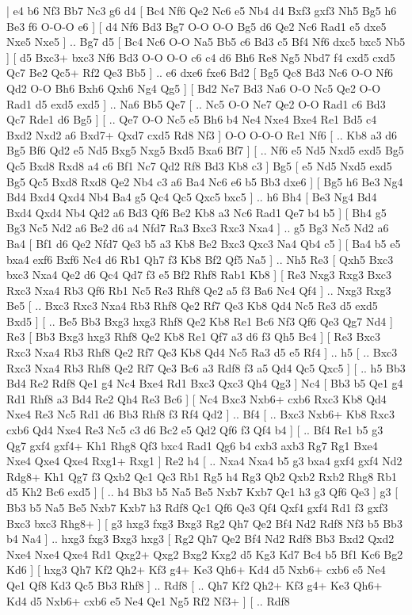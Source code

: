 \makegametitle 
|   e4   b6    Nf3   Bb7    Nc3   g6    d4 [  Bc4 Nf6  Qe2 Nc6  e5 Nb4  d4 Bxf3  gxf3 Nh5  Bg5 h6  Be3 f6  O-O-O e6   ]  [  d4 Nf6  Bd3 Bg7  O-O O-O  Bg5 d6  Qe2 Nc6  Rad1 e5  dxe5 Nxe5  Nxe5   ] .. Bg7    d5 [  Bc4 Nc6  O-O Na5  Bb5 c6  Bd3 c5  Bf4 Nf6  dxc5 bxc5  Nb5   ]  [  d5 Bxc3+  bxc3 Nf6  Bd3 O-O  O-O c6  c4 d6  Bh6 Re8  Ng5 Nbd7  f4 cxd5  cxd5 Qc7  Be2 Qc5+  Rf2 Qe3  Bb5   ] .. e6    dxe6   fxe6    Bd2 [  Bg5 Qc8  Bd3 Nc6  O-O Nf6  Qd2 O-O  Bh6 Bxh6  Qxh6 Ng4  Qg5   ]  [  Bd2 Ne7  Bd3 Na6  O-O Nc5  Qe2 O-O  Rad1 d5  exd5 exd5   ] .. Na6    Bb5   Qe7 [ .. Nc5  O-O Ne7  Qe2 O-O  Rad1 c6  Bd3 Qc7  Rde1 d6  Bg5   ]  [ .. Qe7  O-O Nc5  e5 Bh6  b4 Ne4  Nxe4 Bxe4  Re1 Bd5  c4 Bxd2  Nxd2 a6  Bxd7+ Qxd7  cxd5 Rd8  Nf3   ]  O-O   O-O-O    Re1   Nf6 [ .. Kb8  a3 d6  Bg5 Bf6  Qd2 e5  Nd5 Bxg5  Nxg5 Bxd5  Bxa6 Bf7   ]  [ .. Nf6  e5 Nd5  Nxd5 exd5  Bg5 Qc5  Bxd8 Rxd8  a4 c6  Bf1 Nc7  Qd2 Rf8  Bd3 Kb8  c3   ]  Bg5 [  e5 Nd5  Nxd5 exd5  Bg5 Qc5  Bxd8 Rxd8  Qe2 Nb4  c3 a6  Ba4 Nc6  e6 b5  Bb3 dxe6   ]  [  Bg5 h6  Be3 Ng4  Bd4 Bxd4  Qxd4 Nb4  Ba4 g5  Qc4 Qc5  Qxc5 bxc5   ] .. h6    Bh4 [  Be3 Ng4  Bd4 Bxd4  Qxd4 Nb4  Qd2 a6  Bd3 Qf6  Be2 Kb8  a3 Nc6  Rad1 Qe7  b4 b5   ]  [  Bh4 g5  Bg3 Nc5  Nd2 a6  Be2 d6  a4 Nfd7  Ra3 Bxc3  Rxc3 Nxa4   ] .. g5    Bg3   Nc5    Nd2   a6    Ba4 [  Bf1 d6  Qe2 Nfd7  Qe3 b5  a3 Kb8  Be2 Bxc3  Qxc3 Na4  Qb4 c5   ]  [  Ba4 b5  e5 bxa4  exf6 Bxf6  Nc4 d6  Rb1 Qh7  f3 Kb8  Bf2 Qf5  Na5   ] .. Nh5    Re3 [  Qxh5 Bxc3  bxc3 Nxa4  Qe2 d6  Qc4 Qd7  f3 e5  Bf2 Rhf8  Rab1 Kb8   ]  [  Re3 Nxg3  Rxg3 Bxc3  Rxc3 Nxa4  Rb3 Qf6  Rb1 Nc5  Re3 Rhf8  Qe2 a5  f3 Ba6  Nc4 Qf4   ] .. Nxg3    Rxg3   Be5 [ .. Bxc3  Rxc3 Nxa4  Rb3 Rhf8  Qe2 Rf7  Qe3 Kb8  Qd4 Nc5  Re3 d5  exd5 Bxd5   ]  [ .. Be5  Bb3 Bxg3  hxg3 Rhf8  Qe2 Kb8  Re1 Bc6  Nf3 Qf6  Qe3 Qg7  Nd4   ]  Re3 [  Bb3 Bxg3  hxg3 Rhf8  Qe2 Kb8  Re1 Qf7  a3 d6  f3 Qh5  Bc4   ]  [  Re3 Bxc3  Rxc3 Nxa4  Rb3 Rhf8  Qe2 Rf7  Qe3 Kb8  Qd4 Nc5  Ra3 d5  e5 Rf4   ] .. h5 [ .. Bxc3  Rxc3 Nxa4  Rb3 Rhf8  Qe2 Rf7  Qe3 Bc6  a3 Rdf8  f3 a5  Qd4 Qc5  Qxc5   ]  [ .. h5  Bb3 Bd4  Re2 Rdf8  Qe1 g4  Nc4 Bxe4  Rd1 Bxc3  Qxc3 Qh4  Qg3   ]  Nc4 [  Bb3 b5  Qe1 g4  Rd1 Rhf8  a3 Bd4  Re2 Qh4  Re3 Bc6   ]  [  Nc4 Bxc3  Nxb6+ cxb6  Rxc3 Kb8  Qd4 Nxe4  Re3 Nc5  Rd1 d6  Bb3 Rhf8  f3 Rf4  Qd2   ] .. Bf4 [ .. Bxc3  Nxb6+ Kb8  Rxc3 cxb6  Qd4 Nxe4  Re3 Nc5  c3 d6  Bc2 e5  Qd2 Qf6  f3 Qf4  b4   ]  [ .. Bf4  Re1 b5  g3 Qg7  gxf4 gxf4+  Kh1 Rhg8  Qf3 bxc4  Rad1 Qg6  b4 cxb3  axb3 Rg7  Rg1 Bxe4  Nxe4 Qxe4  Qxe4 Rxg1+  Rxg1   ]  Re2   h4 [ .. Nxa4  Nxa4 b5  g3 bxa4  gxf4 gxf4  Nd2 Rdg8+  Kh1 Qg7  f3 Qxb2  Qc1 Qc3  Rb1 Rg5  h4 Rg3  Qb2 Qxb2  Rxb2 Rhg8  Rb1 d5  Kh2 Bc6  exd5   ]  [ .. h4  Bb3 b5  Na5 Be5  Nxb7 Kxb7  Qc1 h3  g3 Qf6  Qe3   ]  g3 [  Bb3 b5  Na5 Be5  Nxb7 Kxb7  h3 Rdf8  Qc1 Qf6  Qe3 Qf4  Qxf4 gxf4  Rd1 f3  gxf3 Bxc3  bxc3 Rhg8+   ]  [  g3 hxg3  fxg3 Bxg3  Rg2 Qh7  Qe2 Bf4  Nd2 Rdf8  Nf3 b5  Bb3 b4  Na4   ] .. hxg3    fxg3   Bxg3    hxg3 [  Rg2 Qh7  Qe2 Bf4  Nd2 Rdf8  Bb3 Bxd2  Qxd2 Nxe4  Nxe4 Qxe4  Rd1 Qxg2+  Qxg2 Bxg2  Kxg2 d5  Kg3 Kd7  Bc4 b5  Bf1 Kc6  Bg2 Kd6   ]  [  hxg3 Qh7  Kf2 Qh2+  Kf3 g4+  Ke3 Qh6+  Kd4 d5  Nxb6+ cxb6  e5 Ne4  Qe1 Qf8  Kd3 Qc5  Bb3 Rhf8   ] .. Rdf8 [ .. Qh7  Kf2 Qh2+  Kf3 g4+  Ke3 Qh6+  Kd4 d5  Nxb6+ cxb6  e5 Ne4  Qe1 Ng5  Rf2 Nf3+   ]  [ .. Rdf8 